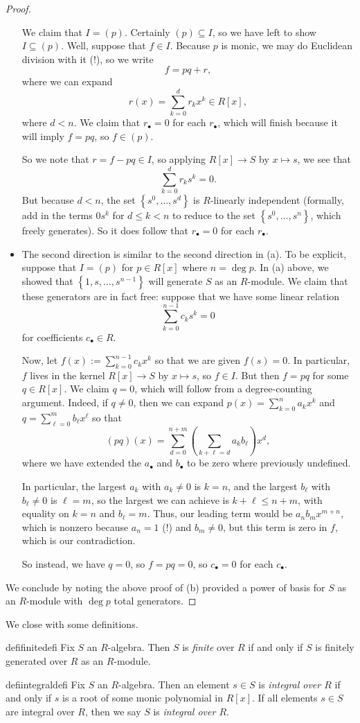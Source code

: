 \begin{proof}
\begin{itemize}
		We claim that $I=(p)$. Certainly $(p)\subseteq I$, so we have left to show $I\subseteq(p)$. Well, suppose that $f\in I$. Because $p$ is monic, we may do Euclidean division with it (!), so we write
		\[f=pq+r,\]
		where we can expand
		\[r(x)=\sum_{k=0}^dr_kx^k\in R[x],\]
		where $d<n$. We claim that $r_\bullet=0$ for each $r_\bullet$, which will finish because it will imply $f=pq$, so $f\in(p)$.

		So we note that $r=f-pq\in I$, so applying $R[x]\to S$ by $x\mapsto s$, we see that
		\[\sum_{k=0}^dr_ks^k=0.\]
		But because $d<n$, the set $\left\{s^0,\ldots,s^d\right\}$ is $R$-linearly independent (formally, add in the terms $0s^k$ for $d\le k<n$ to reduce to the set $\left\{s^0,\ldots,s^n\right\}$, which freely generates). So it does follow that $r_\bullet=0$ for each $r_\bullet$.

		\item The second direction is similar to the second direction in (a). To be explicit, suppose that $I=(p)$ for $p\in R[x]$ where $n=\deg p$. In (a) above, we showed that $\left\{1,s,\ldots,s^{n-1}\right\}$ will generate $S$ as an $R$-module. We claim that these generators are in fact free: suppose that we have some linear relation
		\[\sum_{k=0}^{n-1}c_ks^k=0\]
		for coefficients $c_\bullet\in R$.
		
		Now, let $f(x):=\sum_{k=0}^{n-1}c_kx^k$ so that we are given $f(s)=0$. In particular, $f$ lives in the kernel $R[x]\to S$ by $x\mapsto s$, so $f\in I$. But then $f=pq$ for some $q\in R[x]$. We claim $q=0$, which will follow from a degree-counting argument. Indeed, if $q\ne0$, then we can expand $p(x)=\sum_{k=0}^na_kx^k$ and $q=\sum_{\ell=0}^mb_\ell x^\ell$ so that
		\[(pq)(x)=\sum_{d=0}^{n+m}\left(\sum_{k+\ell=d}a_kb_\ell\right)x^d,\]
		where we have extended the $a_\bullet$ and $b_\bullet$ to be zero where previously undefined.
		
		In particular, the largest $a_k$ with $a_k\ne0$ is $k=n$, and the largest $b_\ell$ with $b_\ell\ne0$ is $\ell=m$, so the largest we can achieve is $k+\ell\le n+m$, with equality on $k=n$ and $b_\ell=m$. Thus, our leading term would be $a_nb_mx^{m+n}$, which is nonzero because $a_n=1$ (!) and $b_m\ne0$, but this term is zero in $f$, which is our contradiction.

		So instead, we have $q=0$, so $f=pq=0$, so $c_\bullet=0$ for each $c_\bullet$.
	\end{itemize}
	We conclude by noting the above proof of (b) provided a power of basis for $S$ as an $R$-module with $\deg p$ total generators.
\end{proof}
We close with some definitions.
\begin{restatable}[Finite]{defi}{finitedefi}
	Fix $S$ an $R$-algebra. Then $S$ is \textit{finite} over $R$ if and only if $S$ is finitely generated over $R$ as an $R$-module.
\end{restatable}
\begin{restatable}[Integral]{defi}{integraldefi}
	Fix $S$ an $R$-algebra. Then an element $s\in S$ is \textit{integral over $R$} if and only if $s$ is a root of some monic polynomial in $R[x]$. If all elements $s\in S$ are integral over $R$, then we say $S$ is \textit{integral over $R$}.
\end{restatable}